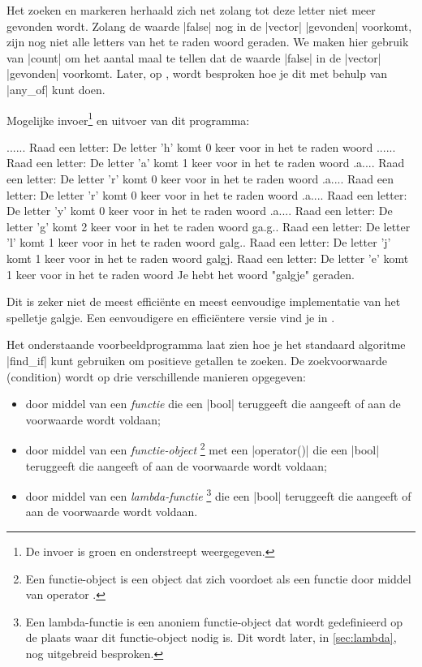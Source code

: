 \begin{cpplstShortInline}
Het zoeken en markeren herhaald zich net zolang tot deze letter niet meer gevonden wordt.
Zolang de waarde |false| nog in de |vector| |gevonden| voorkomt, zijn nog niet alle letters van het te raden woord geraden.
We maken hier gebruik van |count| om het aantal maal te tellen dat de waarde |false| in de |vector| |gevonden| voorkomt.
Later, op , wordt besproken hoe je dit met behulp van |any_of| kunt doen.


Mogelijke invoer\footnote{%
	De invoer is groen en onderstreept weergegeven.
} en uitvoer van dit programma:
\begin{coutput}
......
Raad een letter: 
De letter 'h' komt 0 keer voor in het te raden woord
......
Raad een letter: 
De letter 'a' komt 1 keer voor in het te raden woord
.a....
Raad een letter: 
De letter 'r' komt 0 keer voor in het te raden woord
.a....
Raad een letter: 
De letter 'r' komt 0 keer voor in het te raden woord
.a....
Raad een letter: 
De letter 'y' komt 0 keer voor in het te raden woord
.a....
Raad een letter: 
De letter 'g' komt 2 keer voor in het te raden woord
ga.g..
Raad een letter: 
De letter 'l' komt 1 keer voor in het te raden woord
galg..
Raad een letter: 
De letter 'j' komt 1 keer voor in het te raden woord
galgj.
Raad een letter: 
De letter 'e' komt 1 keer voor in het te raden woord
Je hebt het woord "galgje" geraden.
\end{coutput}

Dit is zeker niet de meest efficiënte en meest eenvoudige implementatie van het spelletje galgje. Een eenvoudigere en efficiëntere versie vind je in .

\label{sec:findif}
Het onderstaande voorbeeldprogramma  laat zien hoe je het standaard algoritme |find_if| kunt gebruiken om positieve getallen te zoeken.
De zoekvoorwaarde (condition) wordt op drie verschillende manieren opgegeven:
\begin{itemize}
	\item door middel van een \emph{functie} die een |bool| teruggeeft die aangeeft of aan de voorwaarde wordt voldaan;
	\item door middel van een \emph{functie\hyp{}object}%
	\footnote{%
		Een functie\hyp{}object is een object dat zich voordoet als een functie door middel van operator .
	} 
	met een  |operator()| die een |bool| teruggeeft die aangeeft of aan de voorwaarde wordt voldaan;
	\item door middel van een \emph{lambda\hyp{}functie}%
	\footnote{%
		Een lambda\hyp{}functie is een anoniem functie\hyp{}object dat wordt gedefinieerd op de plaats waar dit functie\hyp{}object nodig is.
		Dit wordt later, in \cref{sec:lambda}, nog uitgebreid besproken.
	}
	die een |bool| teruggeeft die aangeeft of aan de voorwaarde wordt voldaan.
\end{itemize}


\end{cpplstShortInline}
